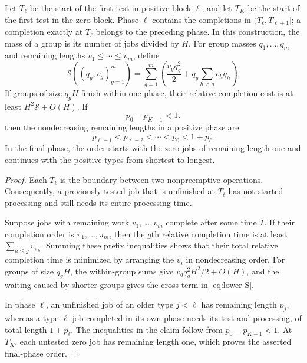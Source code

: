 \begin{claim}
\label{clm:lower-phase-relaxation}
Let $T_\ell$ be the start of the first test in positive block $\ell$, and let
$T_K$ be the start of the first test in the zero block.  Phase $\ell$ contains
the completions in $(T_\ell,T_{\ell+1}]$; a completion exactly at $T_\ell$
belongs to the preceding phase.  In this construction, the mass of a group
is its number of jobs divided by $H$.  For group masses $q_1,\ldots,q_m$ and
remaining lengths $v_1\le\cdots\le v_m$, define
\begin{equation}
 \mathcal S((q_g,v_g)_{g=1}^m)
 =\sum_{g=1}^m
   \left(\frac{v_gq_g^2}{2}
    +q_g\sum_{h<g}v_hq_h\right).
 \label{eq:lower-S}
\end{equation}
If groups of size $q_gH$ finish within one phase, their relative completion
cost is at least $H^2\mathcal S+O(H)$.  If
\begin{equation}
  p_0-p_{K-1}<1.
  \label{eq:lower-span}
\end{equation}
then the nondecreasing remaining lengths in a positive phase are
\[
  p_{\ell-1}<p_{\ell-2}<\cdots<p_0<1+p_\ell.
\]
In the final phase, the order starts with the zero jobs of remaining length
one and continues with the positive types from shortest to longest.
\end{claim}

\begin{proof}
Each $T_\ell$ is the boundary between two nonpreemptive operations.
Consequently, a previously tested job that is unfinished at $T_\ell$ has
not started processing and still needs its entire processing time.

Suppose jobs with remaining work $v_1,\ldots,v_m$ complete after some time
$T$.  If their completion order is $\pi_1,\ldots,\pi_m$, then the $g$th relative
completion time is at least $\sum_{h\le g}v_{\pi_h}$.  Summing these prefix
inequalities shows that their total relative completion time is minimized by
arranging the $v_i$ in nondecreasing order.  For groups of size $q_gH$, the
within-group sums give $v_gq_g^2H^2/2+O(H)$, and the waiting caused by shorter
groups gives the cross term in \cref{eq:lower-S}.

In phase $\ell$, an unfinished job of an older type $j<\ell$ has remaining
length $p_j$, whereas a type-$\ell$ job completed in its own phase needs its
test and processing, of total length $1+p_\ell$.  The inequalities in the
claim follow from $p_0-p_{K-1}<1$.  At $T_K$, each untested zero job has
remaining length one, which proves the asserted final-phase order.
\end{proof}

